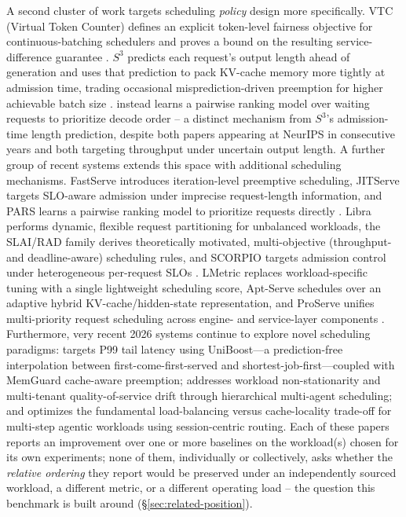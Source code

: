 \documentclass[sn-basic,Numbered,pdflatex]{sn-jnl}
\begin{document}
A second cluster of work targets scheduling \emph{policy} design more
specifically. VTC (Virtual Token Counter) defines an explicit token-level
fairness objective for continuous-batching schedulers and proves a bound on
the resulting service-difference guarantee \citep{sheng2024vtc}. $S^3$
predicts each request's output length ahead of generation and uses that
prediction to pack KV-cache memory more tightly at admission time, trading
occasional misprediction-driven preemption for higher achievable batch size
\citep{jin2023s3}. \citet{efficientllmscheduling2024} instead learns a
pairwise ranking model over waiting requests to prioritize decode order --
a distinct mechanism from $S^3$'s admission-time length prediction, despite
both papers appearing at NeurIPS in consecutive years and both targeting
throughput under uncertain output length. A further group of recent systems
extends this space with additional scheduling mechanisms. FastServe
introduces iteration-level preemptive scheduling, JITServe targets
SLO-aware admission under imprecise request-length information, and PARS
learns a pairwise ranking model to prioritize requests directly
\citep{fastserve2024,jitserve2025,pars2025}. Libra performs dynamic,
flexible request partitioning for unbalanced workloads, the SLAI/RAD
family derives theoretically motivated, multi-objective (throughput- and
deadline-aware) scheduling rules, and SCORPIO targets admission control
under heterogeneous per-request SLOs
\citep{libra2026,slai2025,scorpio2025}. LMetric replaces workload-specific
tuning with a single lightweight scheduling score, Apt-Serve schedules
over an adaptive hybrid KV-cache/hidden-state representation, and ProServe
unifies multi-priority request scheduling across engine- and service-layer
components \citep{lmetric2026,aptserve2025,proserve2025}. Furthermore, very
recent 2026 systems continue to explore novel scheduling paradigms:
\citet{li2026beyond} targets P99 tail latency using UniBoost---a prediction-free
interpolation between first-come-first-served and shortest-job-first---coupled
with MemGuard cache-aware preemption; \citet{liu2026hmas} addresses workload
non-stationarity and multi-tenant quality-of-service drift through
hierarchical multi-agent scheduling; and \citet{wang2026smetric} optimizes the
fundamental load-balancing versus cache-locality trade-off for multi-step
agentic workloads using session-centric routing. Each of these
papers reports an improvement over one or more baselines on
the workload(s) chosen for its own experiments; none of them, individually
or collectively, asks whether the \emph{relative ordering} they report would
be preserved under an independently sourced workload, a different metric,
or a different operating load -- the question this benchmark is built
around (\S\ref{sec:related-position}).
\end{document}

